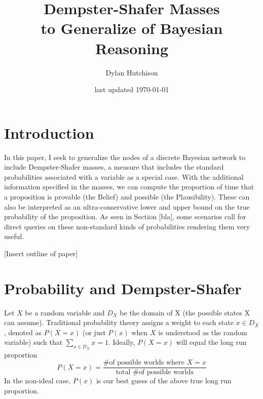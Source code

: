 \documentclass[letterpaper]{article}
\begin{document}
\thispagestyle{empty}
\pagestyle{empty} %

\author{Dylan Hutchison}
\title{Dempster-Shafer Masses \\to Generalize of Bayesian Reasoning}
\date{last updated \today}
\maketitle


\section{Introduction}
In this paper, I seek to generalize the nodes of a discrete Bayesian network to include Dempster-Shafer masses, a measure that includes the standard probabilities associated with a variable as a special case.  With the additional information specified in the masses, we can compute the proportion of time that a proposition is provable (the Belief) and possible (the Plausibility).  These can also be interpreted as an ultra-conservative lower and upper bound on the true probability of the proposition.  As seen in Section [bla], some scenarios call for direct queries on these non-standard kinds of probabilities rendering them very useful.

[Insert outline of paper]

\section{Probability and Dempster-Shafer}
Let $X$ be a random variable and $D_X$ be the domain of X (the possible states X can assume).  Traditional probability theory assigns a weight to each state $x \in D_X$, denoted as $P(X=x)$ (or just $P(x)$ when $X$ is understood as the random variable) such that $\sum_{x \in D_X}x = 1$. Ideally, $P(X=x)$ will equal the long run proportion 
\[P(X=x) = \dfrac{\text{\# of possible worlds where } X=x}{\text{total \# of possible worlds}}\]
In the non-ideal case, $P(x)$ is our best guess of the above true long run proportion.
\end{document}
